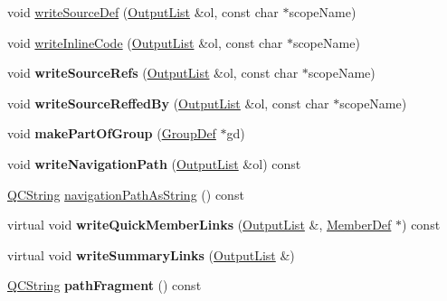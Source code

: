 \begin{DoxyCompactItemize}
\item 
void \hyperlink{class_definition_a3743f2020b717483a31b241d35c373be}{write\-Source\-Def} (\hyperlink{class_output_list}{Output\-List} \&ol, const char $\ast$scope\-Name)
\item 
void \hyperlink{class_definition_ad05e364c8393849dc22ac69568d96fc5}{write\-Inline\-Code} (\hyperlink{class_output_list}{Output\-List} \&ol, const char $\ast$scope\-Name)
\item 
\hypertarget{class_definition_ac96c5b1845765ffca222e47c437dfe35}{void {\bfseries write\-Source\-Refs} (\hyperlink{class_output_list}{Output\-List} \&ol, const char $\ast$scope\-Name)}\label{class_definition_ac96c5b1845765ffca222e47c437dfe35}

\item 
\hypertarget{class_definition_a0e46032a2257272d2ada587f3ce79388}{void {\bfseries write\-Source\-Reffed\-By} (\hyperlink{class_output_list}{Output\-List} \&ol, const char $\ast$scope\-Name)}\label{class_definition_a0e46032a2257272d2ada587f3ce79388}

\item 
\hypertarget{class_definition_a0304edb36523800ca53a7ee6f23832b7}{void {\bfseries make\-Part\-Of\-Group} (\hyperlink{class_group_def}{Group\-Def} $\ast$gd)}\label{class_definition_a0304edb36523800ca53a7ee6f23832b7}

\item 
\hypertarget{class_definition_ab65ecb79aadef32e39c5425889f61e0b}{void {\bfseries write\-Navigation\-Path} (\hyperlink{class_output_list}{Output\-List} \&ol) const }\label{class_definition_ab65ecb79aadef32e39c5425889f61e0b}

\item 
\hyperlink{class_q_c_string}{Q\-C\-String} \hyperlink{class_definition_a145ca0e33e5be8b0d08c98e220df90b6}{navigation\-Path\-As\-String} () const 
\item 
\hypertarget{class_definition_ab725f086c32e8031bd6b7ef3872b16b7}{virtual void {\bfseries write\-Quick\-Member\-Links} (\hyperlink{class_output_list}{Output\-List} \&, \hyperlink{class_member_def}{Member\-Def} $\ast$) const }\label{class_definition_ab725f086c32e8031bd6b7ef3872b16b7}

\item 
\hypertarget{class_definition_a9729aba18075a7633d2ab82b44bedda9}{virtual void {\bfseries write\-Summary\-Links} (\hyperlink{class_output_list}{Output\-List} \&)}\label{class_definition_a9729aba18075a7633d2ab82b44bedda9}

\item 
\hypertarget{class_definition_a9bb8b27ede967f9a5a02ef02647a9faa}{\hyperlink{class_q_c_string}{Q\-C\-String} {\bfseries path\-Fragment} () const }\label{class_definition_a9bb8b27ede967f9a5a02ef02647a9faa}


\end{DoxyCompactItemize}
